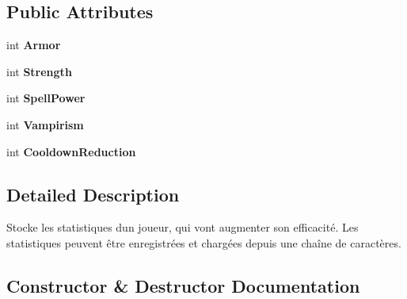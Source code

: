 \subsection*{Public Attributes}
\begin{DoxyCompactItemize}
\item 
\mbox{\label{class_tentacle_slicers_1_1actors_1_1_player_stats_a8c938549333beaab41c805bf758e9f43}} 
int {\bfseries Armor}
\item 
\mbox{\label{class_tentacle_slicers_1_1actors_1_1_player_stats_a6ed0f49d016587771f185cebcc9847a6}} 
int {\bfseries Strength}
\item 
\mbox{\label{class_tentacle_slicers_1_1actors_1_1_player_stats_ad905c53bce2226802d8dc57c903fd561}} 
int {\bfseries Spell\+Power}
\item 
\mbox{\label{class_tentacle_slicers_1_1actors_1_1_player_stats_a38fe172126bba50e3361e7cc25825814}} 
int {\bfseries Vampirism}
\item 
\mbox{\label{class_tentacle_slicers_1_1actors_1_1_player_stats_a2f3ba92bde9ebb09e74cf01dd3c0d378}} 
int {\bfseries Cooldown\+Reduction}
\end{DoxyCompactItemize}


\subsection{Detailed Description}
Stocke les statistiques d\textquotesingle{}un joueur, qui vont augmenter son efficacité. Les statistiques peuvent être enregistrées et chargées depuis une chaîne de caractères. 



\subsection{Constructor \& Destructor Documentation}
\mbox{\label{class_tentacle_slicers_1_1actors_1_1_player_stats_a0a2b8101d263a29f19192254bc6bce7e}} 
